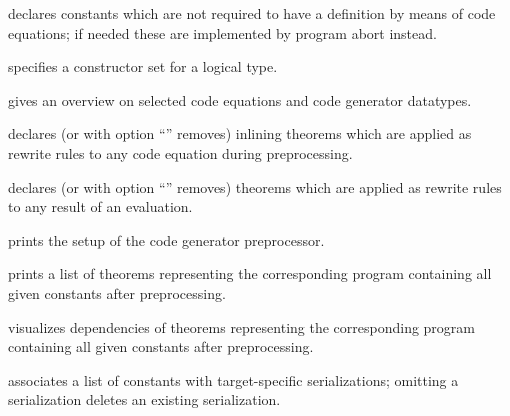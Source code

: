 \begin{isabellebody}
\begin{isamarkuptext}
\begin{description}
  \item \hyperlink{command.HOL.code-abort}{\mbox{}} declares constants which are not
  required to have a definition by means of code equations; if needed
  these are implemented by program abort instead.

  \item \hyperlink{command.HOL.code-datatype}{\mbox{}} specifies a constructor set
  for a logical type.

  \item \hyperlink{command.HOL.print-codesetup}{\mbox{}} gives an overview on
  selected code equations and code generator datatypes.

  \item \hyperlink{attribute.HOL.code-inline}{\mbox{}} declares (or with option
  ``'' removes) inlining theorems which are applied as
  rewrite rules to any code equation during preprocessing.

  \item \hyperlink{attribute.HOL.code-post}{\mbox{}} declares (or with option ``'' removes) theorems which are applied as rewrite rules to any
  result of an evaluation.

  \item \hyperlink{command.HOL.print-codeproc}{\mbox{}} prints the setup of the code
  generator preprocessor.

  \item \hyperlink{command.HOL.code-thms}{\mbox{}} prints a list of theorems
  representing the corresponding program containing all given
  constants after preprocessing.

  \item \hyperlink{command.HOL.code-deps}{\mbox{}} visualizes dependencies of
  theorems representing the corresponding program containing all given
  constants after preprocessing.

  \item \hyperlink{command.HOL.code-const}{\mbox{}} associates a list of constants
  with target-specific serializations; omitting a serialization
  deletes an existing serialization.


\end{description}
\end{isamarkuptext}
\end{isabellebody}
